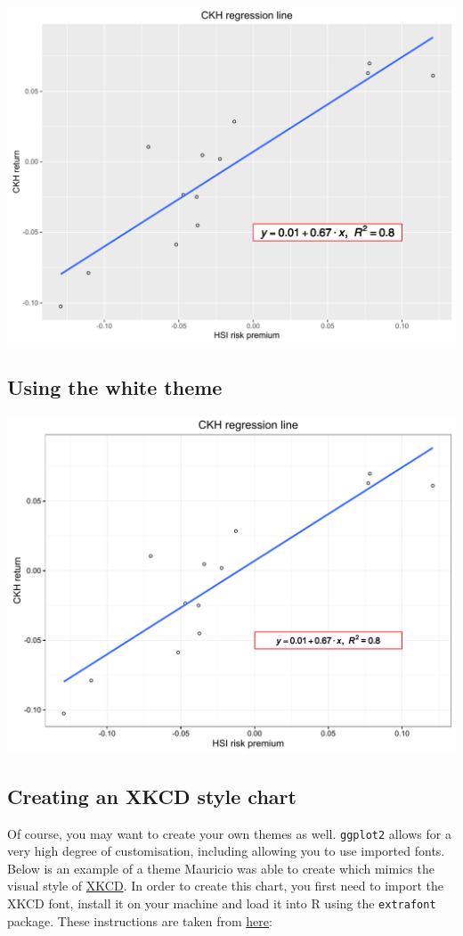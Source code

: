 \begin{center}\includegraphics[width=0.55\linewidth]{figures/lr_13-1} \end{center}

\subsection{Using the white theme}\label{using-the-white-theme-10}

\begin{Shaded}
\begin{Highlighting}[]
\StringTok{ }\StringTok{ }\NormalTok{()}
\end{Highlighting}
\end{Shaded}

\begin{center}\includegraphics[width=0.55\linewidth]{figures/lr_14-1} \end{center}

\subsection{Creating an XKCD style
chart}\label{creating-an-xkcd-style-chart-10}

Of course, you may want to create your own themes as well.
\texttt{ggplot2} allows for a very high degree of customisation,
including allowing you to use imported fonts. Below is an example of a
theme Mauricio was able to create which mimics the visual style of
\href{http://xkcd.com/}{XKCD}. In order to create this chart, you first
need to import the XKCD font, install it on your machine and load it
into R using the \texttt{extrafont} package. These instructions are
taken from
\href{https://www.google.com.au/url?sa=t\&rct=j\&q=\&esrc=s\&source=web\&cd=1\&ved=0ahUKEwiWzafchdPJAhVBpJQKHe_LDT8QFggbMAA\&url=https\%3A\%2F\%2Fcran.r-project.org\%2Fweb\%2Fpackages\%2Fxkcd\%2Fvignettes\%2Fxkcd-intro.pdf\&usg=AFQjCNE-KciGY14e-Q1buYIVmTFC0ht__Q\&sig2=DZUwkvIHwfNWtTtkcz94jg}{here}:

